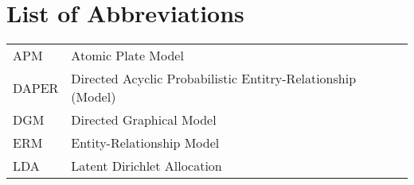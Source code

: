 \section*{List of Abbreviations}

\begin{tabular}{ll}
APM & Atomic Plate Model\\
DAPER & Directed Acyclic Probabilistic Entitry-Relationship (Model)\\
DGM & Directed Graphical Model\\
ERM & Entity-Relationship Model\\
LDA & Latent Dirichlet Allocation
\end{tabular}